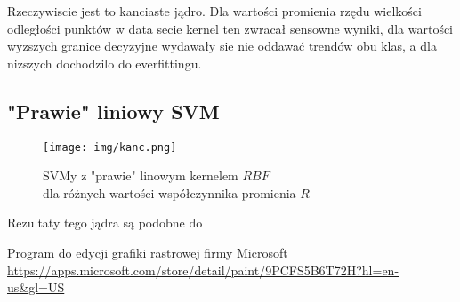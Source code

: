 Rzeczywiscie jest to kanciaste jądro. Dla wartości promienia rzędu wielkości odległości punktów w data secie kernel ten zwracał sensowne wyniki, dla wartości wyzszych granice decyzyjne wydawały sie nie oddawać trendów obu klas, a dla nizszych dochodzilo do everfittingu.

\subsection{"Prawie" liniowy SVM}

\begin{figure}[H]
    \centering
    \texttt{[image: img/kanc.png]}
    \caption{SVMy z "prawie" linowym kernelem $RBF$\\dla różnych wartości współczynnika promienia $R$}
\end{figure}

Rezultaty tego jądra są podobne do 

\begin{thebibliography}{9}
        Program do edycji grafiki rastrowej firmy Microsoft \\
        \url{https://apps.microsoft.com/store/detail/paint/9PCFS5B6T72H?hl=en-us&gl=US}
\end{thebibliography}

